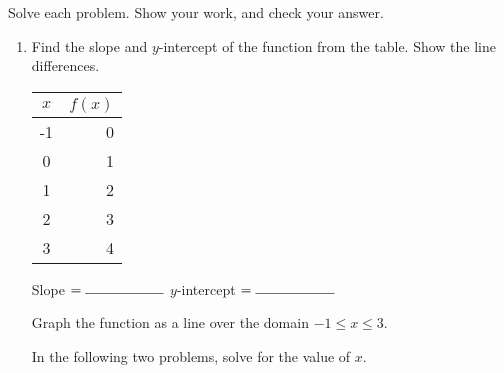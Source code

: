 \documentclass[12pt, oneside]{article}
\begin{document}
  Solve each problem. Show your work, and check your answer.
  \begin{enumerate}
    \subsubsection*{Exam - Part B}

\item Find the slope and $y$-intercept of the function from the table. Show the line differences.
    \begin{multicols}{2}
      \begin{tabular}{|c|r|}
      \hline
      $x$ & $f(x)$\\
      \hline
      -1 & 0 \\
      \hline
      0 & 1 \\
      \hline
      1 & 2 \\
      \hline
      2 & 3 \\
      \hline
      3 & 4 \\
      \hline
      \end{tabular}

      Slope $= \rule{2cm}{0.15mm}\\[0.5cm]$
      $y$-intercept $= \rule{2cm}{0.15mm}$ \\[0.5cm]

    \end{multicols}
Graph the function as a line over the domain $-1 \leq x \leq 3$.

\begin{center} %
\end{center}

In the following two problems, solve for the value of $x$.


\end{enumerate}
\end{document}
